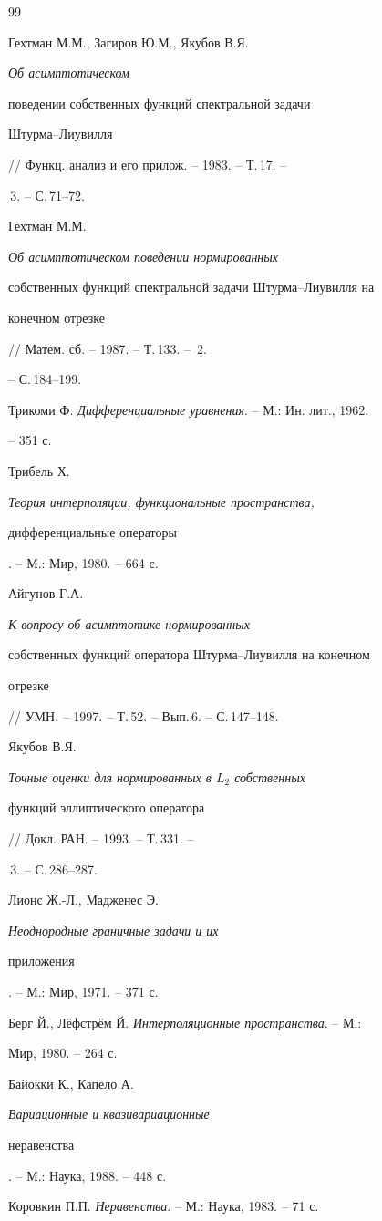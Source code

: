 \begin{thebibliography}{99} 


 




Гехтман М.М., Загиров Ю.М., Якубов В.Я. {\em Об асимптотическом 


поведении собственных функций спектральной задачи 


Штурма--Лиувилля} // Функц. анализ и его прилож. -- 1983. -- Т.\,17. -- 


\No\,3. -- С.\,71--72. 




Гехтман М.М. {\em Об асимптотическом поведении нормированных 


собственных функций спектральной задачи Штурма--Лиувилля на 


конечном отрезке} // Матем. сб. -- 1987. -- Т.\,133. -- \No\,2. 


-- С.\,184--199. 




Трикоми Ф. {\em Дифференциальные уравнения}. -- М.: Ин. лит., 1962. 


-- 351 с. 




Трибель Х. {\em Теория интерполяции, функциональные пространства, 


дифференциальные операторы}. -- М.: Мир, 1980. -- 664 с. 




Айгунов Г.А. {\em К вопросу об асимптотике нормированных 


собственных функций оператора Штурма--Лиувилля на конечном 


отрезке} // УМН. -- 1997. -- Т.\,52. -- Вып.\,6. -- С.\,147--148. 




Якубов В.Я. {\em Точные оценки для нормированных в $L_2$ собственных 


функций эллиптического оператора} // Докл. РАН. -- 1993. -- Т.\,331. -- 


\No\,3. -- С.\,286--287. 




Лионс Ж.-Л., Мадженес Э. {\em Неоднородные граничные задачи и их 


приложения}. -- М.: Мир, 1971. -- 371 с. 




Берг Й., Л\"ефстр\"ем Й. {\em Интерполяционные пространства}. -- М.: 


Мир, 1980. -- 264 с.




Байокки К., Капело А. {\em Вариационные и квазивариационные 


неравенства}. -- М.: Наука, 1988. -- 448 с. 




Коровкин П.П. {\em Неравенства}. -- М.: Наука, 1983. -- 71 с. 


 


\end{thebibliography} 


